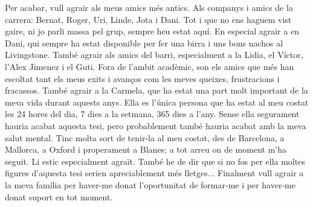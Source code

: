{%
Per acabar, vull agrair als meus amics més antics. Als companys i amics de la
carrera: Bernat, Roger, Uri, Linde, Jota i Dani. Tot i que no ens haguem vist
gaire, ni jo parli massa pel grup, sempre heu estat aquí. En especial agrair a
en Dani, qui sempre ha estat disponible per fer una birra i uns bons nachos al
Livingstone. També agrair als amics del barri, especialment a la Lidia, el
Víctor, l'Alex Jimenez i el Guti. Fora de l'ambit acadèmic, son els amics que
més han escoltat tant els meus exits i avanços com les meves queixes,
frustracions i fracassos. També agrair a la Carmela, que ha estat una part molt
important de la meva vida durant aquests anys. Ella es l'única persona que ha
estat al meu costat les 24 hores del dia, 7 dies a la setmana, 365 dies a
l'any. Sense ella segurament hauria acabat aquesta tesi, pero probablement
també hauria acabat amb la meva salut mental. Tinc molta sort de tenir-la al
meu costat, des de Barcelona, a Mallorca, a Oxford i properament a Blanes; a
tot arreu on de moment m'ha seguit. Li estic especialment agraït. També he de
dir que si no fos per ella moltes figures d'aquesta tesi serien apreciablement
més lletges... Finalment vull agrair a la meva família per haver-me donat
l'oportunitat de formar-me i per haver-me donat suport en tot moment.
}

\vfill